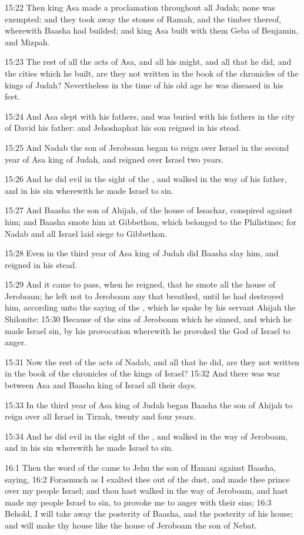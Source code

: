 15:22 Then king Asa made a proclamation throughout all Judah; none was
exempted: and they took away the stones of Ramah, and the timber
thereof, wherewith Baasha had builded; and king Asa built with them
Geba of Benjamin, and Mizpah.

15:23 The rest of all the acts of Asa, and all his might, and all that
he did, and the cities which he built, are they not written in the
book of the chronicles of the kings of Judah? Nevertheless in the time
of his old age he was diseased in his feet.

15:24 And Asa slept with his fathers, and was buried with his fathers
in the city of David his father: and Jehoshaphat his son reigned in
his stead.

15:25 And Nadab the son of Jeroboam began to reign over Israel in the
second year of Asa king of Judah, and reigned over Israel two years.

15:26 And he did evil in the sight of the \LORD, and walked in the way
of his father, and in his sin wherewith he made Israel to sin.

15:27 And Baasha the son of Ahijah, of the house of Issachar,
conspired against him; and Baasha smote him at Gibbethon, which
belonged to the Philistines; for Nadab and all Israel laid siege to
Gibbethon.

15:28 Even in the third year of Asa king of Judah did Baasha slay him,
and reigned in his stead.

15:29 And it came to pass, when he reigned, that he smote all the
house of Jeroboam; he left not to Jeroboam any that breathed, until he
had destroyed him, according unto the saying of the \LORD, which he
spake by his servant Ahijah the Shilonite: 15:30 Because of the sins
of Jeroboam which he sinned, and which he made Israel sin, by his
provocation wherewith he provoked the \LORD God of Israel to anger.

15:31 Now the rest of the acts of Nadab, and all that he did, are they
not written in the book of the chronicles of the kings of Israel?
15:32 And there was war between Asa and Baasha king of Israel all
their days.

15:33 In the third year of Asa king of Judah began Baasha the son of
Ahijah to reign over all Israel in Tirzah, twenty and four years.

15:34 And he did evil in the sight of the \LORD, and walked in the way
of Jeroboam, and in his sin wherewith he made Israel to sin.

16:1 Then the word of the \LORD came to Jehu the son of Hanani against
Baasha, saying, 16:2 Forasmuch as I exalted thee out of the dust, and
made thee prince over my people Israel; and thou hast walked in the
way of Jeroboam, and hast made my people Israel to sin, to provoke me
to anger with their sins; 16:3 Behold, I will take away the posterity
of Baasha, and the posterity of his house; and will make thy house
like the house of Jeroboam the son of Nebat.

